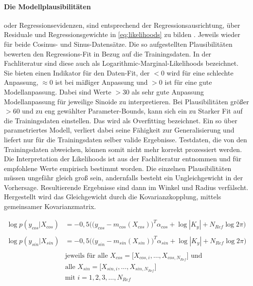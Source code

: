 \paragraph*{Die Modellplausibilitäten} oder Regressionsevidenzen, sind entsprechend der Regressionsausrichtung, über Residuale und Regressionsgewichte in \autoref{eq:likelihoods} zu bilden \cite{Rasmussen2006}. Jeweils wieder für beide Cosinus- und Sinus-Datensätze. Die so aufgestellten Plausibilitäten bewerten den Regressions-Fit in Bezug auf die Trainingsdaten. In der Fachliteratur \cite{Rasmussen2006} sind diese auch als Logarithmic-Marginal-Likelihoods bezeichnet. Sie bieten einen Indikator für den Daten-Fit, der $< 0$ wird für eine schlechte Anpassung, $\approx 0$ ist bei mäßiger Anpassung und $> 0$ ist für eine gute Modellanpassung. Dabei sind Werte $> 30$ als sehr gute Anpassung Modellanpassung für jeweilige Sinoide zu interpretieren. Bei Plausibilitäten größer $> 60$ und zu eng gewählter Parameter-Bounds, kann sich ein zu Starker Fit auf die Trainingsdaten einstellen. Das wird als Overfitting bezeichnet. Ein so über parametriertes Modell, verliert dabei seine Fähigkeit zur Generalisierung und liefert nur für die Trainingsdaten selber valide Ergebnisse. Testdaten, die von den Trainingsdaten abweichen, können somit nicht mehr korrekt prozessiert werden. Die Interpretation der Likelihoods ist aus der Fachliteratur \cite{Rasmussen2006} entnommen und für empfohlene Werte empirisch bestimmt worden. Die einzelnen Plausibilitäten müssen ungefähr gleich groß sein, andernfalls besteht ein Ungleichgewicht in der Vorhersage. Resultierende Ergebnisse sind dann im Winkel und Radius verfälscht. Hergestellt wird das Gleichgewicht durch die Kovarianzkopplung, mittels gemeinsamer Kovarianzmatrix.


\begin{align}\label{eq:likelihoods}
	\log p(y_{cos}|X_{cos}) &= -0,5 \Big( \big( y_{cos} - m_{cos}(X_{cos}) \big)^T \alpha_{cos} + \log|K_y| + N_{Ref} \log 2\pi  \Big) \nonumber \\
	\\
	\log p(y_{sin}|X_{sin}) &= -0,5 \Big( \big( y_{sin} - m_{sin}(X_{sin}) \big)^T \alpha_{sin} + \log|K_y| + N_{Ref} \log 2\pi  \Big) \nonumber \\
	\nonumber \\
& \text{jeweils für alle } X_{cos} = \big[ X_{cos,i},\dots, X_{cos,N_{Ref}} \big] \text{ und } \nonumber \\
& \text{alle } X_{sin} = \big[ X_{sin,i},\dots, X_{sin,N_{Ref}} \big] \nonumber \\
& \text{mit } i = 1,2,3,\ldots,N_{Ref} \nonumber	
\end{align}


